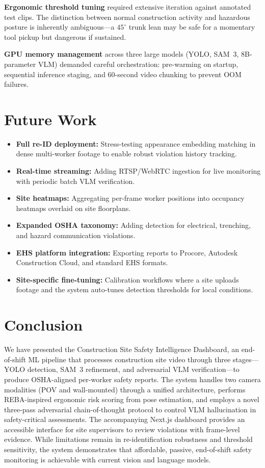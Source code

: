 \documentclass[11pt, twocolumn]{article}
\begin{document}
\textbf{Ergonomic threshold tuning} required extensive iteration against annotated test clips. The distinction between normal construction activity and hazardous posture is inherently ambiguous---a $45^\circ$ trunk lean may be safe for a momentary tool pickup but dangerous if sustained.

\textbf{GPU memory management} across three large models (YOLO, SAM~3, 8B-parameter VLM) demanded careful orchestration: pre-warming on startup, sequential inference staging, and 60-second video chunking to prevent OOM failures.

\section{Future Work}

\begin{itemize}[nosep, leftmargin=*]
    \item \textbf{Full re-ID deployment:} Stress-testing appearance embedding matching in dense multi-worker footage to enable robust violation history tracking.
    \item \textbf{Real-time streaming:} Adding RTSP/WebRTC ingestion for live monitoring with periodic batch VLM verification.
    \item \textbf{Site heatmaps:} Aggregating per-frame worker positions into occupancy heatmaps overlaid on site floorplans.
    \item \textbf{Expanded OSHA taxonomy:} Adding detection for electrical, trenching, and hazard communication violations.
    \item \textbf{EHS platform integration:} Exporting reports to Procore, Autodesk Construction Cloud, and standard EHS formats.
    \item \textbf{Site-specific fine-tuning:} Calibration workflows where a site uploads footage and the system auto-tunes detection thresholds for local conditions.
\end{itemize}

\section{Conclusion}

We have presented the Construction Site Safety Intelligence Dashboard, an end-of-shift ML pipeline that processes construction site video through three stages---YOLO detection, SAM~3 refinement, and adversarial VLM verification---to produce OSHA-aligned per-worker safety reports. The system handles two camera modalities (POV and wall-mounted) through a unified architecture, performs REBA-inspired ergonomic risk scoring from pose estimation, and employs a novel three-pass adversarial chain-of-thought protocol to control VLM hallucination in safety-critical assessments. The accompanying Next.js dashboard provides an accessible interface for site supervisors to review violations with frame-level evidence. While limitations remain in re-identification robustness and threshold sensitivity, the system demonstrates that affordable, passive, end-of-shift safety monitoring is achievable with current vision and language models.
\end{document}

